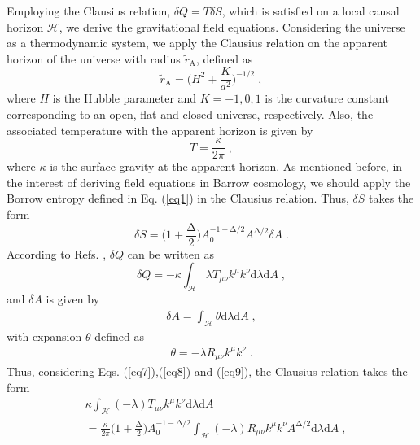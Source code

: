 \documentclass[11pt,twocolumn]{article}
\begin{document}
Employing the Clausius relation, $\delta Q=T \delta S$, which is
satisfied on a local causal horizon $\mathcal{H}$, we derive the
gravitational field equations. Considering the universe as a
thermodynamic system, we apply the Clausius relation on the
apparent horizon of the universe with radius
$\tilde{r}_\mathrm{A}$, defined as \cite{ra1}
\begin{equation} \label{eq6}
\tilde{r}_\mathrm{A}=\Big(H^2+\frac{K}{a^2}\Big)^{-1/2} \;,
\end{equation}
where $H$ is the Hubble parameter and $K=-1,0,1$ is the curvature
constant corresponding to an open, flat and closed universe,
respectively. Also, the associated temperature with the apparent
horizon is given by
\begin{equation} \label{eq7}
T=\frac{\kappa}{2\pi} \;,
\end{equation}
where $\kappa$ is the surface gravity at the apparent horizon. As
mentioned before, in the interest of deriving field equations in
Barrow cosmology, we should apply the Borrow entropy defined in
Eq. (\ref{eq1}) in the Clausius relation. Thus, $\delta S$ takes the
form
\begin{equation} \label{eq8}
\delta S=\Big(1+\frac{\mathrm{\Delta}}{2}\Big) A_0^{-1-\mathrm{\Delta}/2}
A^{\mathrm{\Delta}/2} \delta A \;.
\end{equation}
According to Refs. \cite{j1,grth3}, $\delta Q$ can be written as
\begin{equation} \label{eq9}
\delta Q= -\kappa \int_{\mathcal{H}}^{} \lambda T_{\mu \nu}
k^{\mu} k^{\nu} \mathrm{d}\lambda \mathrm{d}A \;,
\end{equation}
and $\delta A$ is given by
\begin{align}
\delta A=\int_{\mathcal{H}}^{} \theta \mathrm{d}\lambda
\mathrm{d}A \;, \label{eq10}
\end{align}
with expansion $\theta$ defined as
    \begin{align}
    \theta=-\lambda R_{\mu \nu} k^{\mu} k^{\nu} \;. \label{eq11}
    \end{align}
Thus, considering Eqs. (\ref{eq7}),(\ref{eq8}) and
(\ref{eq9}), the Clausius relation takes the form
    \begin{align}
    & \kappa \int_{\mathcal{H}}^{} (-\lambda) T_{\mu \nu} k^{\mu} k^{\nu} \mathrm{d}\lambda \mathrm{d}A \nonumber \\
    &=\frac{\kappa}{2\pi} \Big(1+\frac{\mathrm{\Delta}}{2}\Big) A_0^{-1-\mathrm{\Delta}/2} \int_{\mathcal{H}}^{} (-\lambda) R_{\mu \nu} k^{\mu} k^{\nu} A^{\mathrm{\Delta}/2} \mathrm{d}\lambda \mathrm{d}A \;, \label{eq12}
    \end{align}
\end{document}
